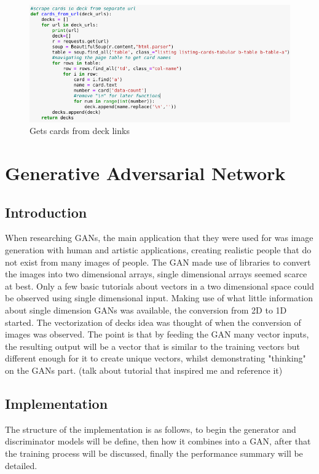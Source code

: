 \documentclass{report} %
\begin{document}
\begin{figure}[H]
\centering
\includegraphics[width=1.25\textwidth]{cardsURL}
\caption{Gets cards from deck links\protect}
 \label{board}
\end{figure}

\section{Generative Adversarial Network}
\subsection{Introduction}
When researching GANs, the main application that they were used for was image generation with human and artistic applications, creating realistic people that do not exist from many images of people. The GAN made use of libraries to convert the images into two dimensional arrays, single dimensional arrays seemed scarce at best. Only a few basic tutorials about vectors in a two dimensional space could be observed using single dimensional input. Making use of what little information about single dimension GANs was available, the conversion from 2D to 1D started. The vectorization of decks idea was thought of when the conversion of images was observed. The point is that by feeding the GAN many vector inputs, the resulting output will be a vector that is similar to the training vectors but different enough for it to create unique vectors, whilst demonstrating "thinking" on the GANs part. (talk about tutorial that inspired me and reference it)
\subsection{Implementation}
The structure of the implementation is as follows, to begin the generator and discriminator models will be define, then how it combines into a GAN, after that the training process will be discussed, finally the performance summary will be detailed.
\end{document}
